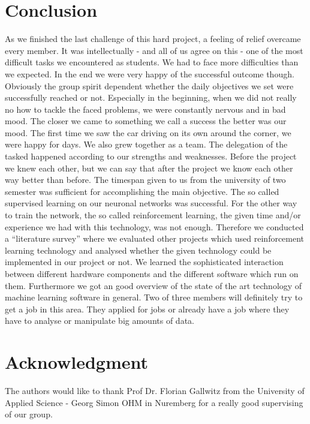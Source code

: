 \documentclass[journal]{IEEEtran}
\begin{document}
\section{Conclusion}
As we finished the last challenge of this hard project, a feeling of relief overcame every member. It was intellectually - and all of us agree on this - one of the most difficult tasks we encountered as students. We had to face more difficulties than we expected. In the end we were very happy of the successful outcome though.
Obviously the group spirit dependent whether the daily objectives we set were successfully reached or not. Especially in the beginning, when we did not really no how to tackle the faced problems, we were constantly nervous and in  bad mood. The closer we came to something we call a success the better was our mood. The first time we saw the car driving on its own around the corner, we were happy for days.
We also grew together as a team. The delegation of the tasked happened according to our strengths and weaknesses. Before the project we knew each other, but we can say that after the project we know each other way better than before.
The timespan given to us from the university of two semester was sufficient for accomplishing the main objective. The so called supervised learning on our neuronal networks was successful. For the other way to train the network, the so called reinforcement learning, the given time and/or experience we had with this technology, was not enough. Therefore we conducted a “literature survey” where we evaluated other projects which used reinforcement learning technology and analysed whether the given technology could be implemented in our project or not. 
We learned the sophisticated interaction between different hardware components and the different software which run on them. Furthermore we got an good overview of the state of the art technology of machine learning software in general.
Two of three members will definitely try to get a job in this area. They applied for jobs or already have a job where they have to analyse or manipulate big amounts of data.

\section*{Acknowledgment}
\noindent The authors would like to thank Prof Dr. Florian Gallwitz from the University of Applied Science - Georg Simon OHM in Nuremberg for a really good supervising of our group. 
\end{document}
